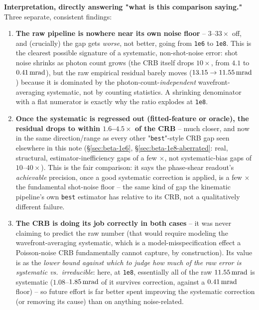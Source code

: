 \documentclass[11pt,a4paper]{article}
\newcommand{\code}[1]{\texttt{#1}}
\begin{document}
\textbf{Interpretation, directly answering "what is this comparison
saying."} Three separate, consistent findings:
\begin{enumerate}
  \item \textbf{The raw pipeline is nowhere near its own noise floor} --
    $3$--$33\times$ off, and (crucially) the gap gets \emph{worse}, not
    better, going from \code{1e6} to \code{1e8}. This is the clearest
    possible signature of a systematic, non-shot-noise error: shot noise
    shrinks as photon count grows (the CRB itself drops $10\times$, from
    $4.1$ to $0.41\,{\rm mrad}$), but the raw empirical residual barely
    moves ($13.15\to11.55\,{\rm mrad}$) because it is dominated by the
    photon-count-\emph{independent} wavefront-averaging systematic, not by
    counting statistics. A shrinking denominator with a flat numerator is
    exactly why the ratio explodes at \code{1e8}.
  \item \textbf{Once the systematic is regressed out (fitted-feature or
    oracle), the residual drops to within $1.6$--$4.5\times$ of the CRB}
    -- much closer, and now in the same direction/range as every other
    "\code{best}"-style CRB gap seen elsewhere in this note
    (\S\ref{sec:beta-1e6}, \S\ref{sec:beta-1e8-aberrated}: real, structural,
    estimator-inefficiency gaps of a few $\times$, not systematic-bias gaps
    of $10$--$40\times$). This is the fair comparison: it says the
    phase-shear readout's \emph{achievable} precision, once a good
    systematic correction is applied, is a few $\times$ the fundamental
    shot-noise floor -- the same kind of gap the kinematic pipeline's own
    \code{best} estimator has relative to its CRB, not a qualitatively
    different failure.
  \item \textbf{The CRB is doing its job correctly in both cases} -- it was
    never claiming to predict the raw number (that would require modeling
    the wavefront-averaging systematic, which is a model-misspecification
    effect a Poisson-noise CRB fundamentally cannot capture, by
    construction). Its value is as the \emph{lower bound against which to
    judge how much of the raw error is systematic vs.\ irreducible}: here,
    at \code{1e8}, essentially all of the raw $11.55\,{\rm mrad}$ is
    systematic ($1.08$--$1.85\,{\rm mrad}$ of it survives correction,
    against a $0.41\,{\rm mrad}$ floor) -- so future effort is far better
    spent improving the systematic correction (or removing its cause) than
    on anything noise-related.
\end{enumerate}
\end{document}
